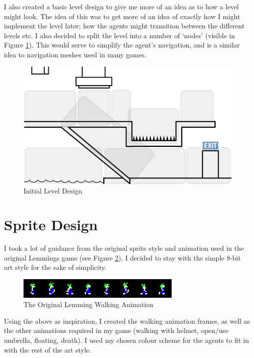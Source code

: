 \documentclass[a4paper,oneside]{report}
\begin{document}
I also created a basic level design to give me more of an idea as to how a level might look. The idea of this was to get more of an idea of exactly how I might implement the level later; how the agents might transition between the different levels etc. I also decided to split the level into a number of `nodes' (visible in Figure \ref{fig:LevelDesign}). This would serve to simplify the agent's navigation, and is a similar idea to navigation meshes used in many games.  

\begin{figure}[h!]
  \centering
    \includegraphics[width=120mm]{sources/images/LevelDesign}
    \caption{Initial Level Design}
    \label{fig:LevelDesign}
\end{figure}
	
\section{Sprite Design}
		
I took a lot of guidance from the original sprite style and animation used in the original Lemmings game (see Figure \ref{fig:LemmingWalkerSprites}). I decided to stay with the simple 8-bit art style for the sake of simplicity.
	
\begin{figure}[h!]
  \centering
    \includegraphics[width=80mm]{sources/images/lemmings-walker-sprites}
    \caption{The Original Lemming Walking Animation \cite{Marsh:vn}}
    \label{fig:LemmingWalkerSprites}
\end{figure}
		
Using the above as inspiration, I created the walking animation frames, as well as the other animations required in my game (walking with helmet, open/use umbrella, floating, death). I used my chosen colour scheme for the agents to fit in with the rest of the art style.
		
\end{document}
